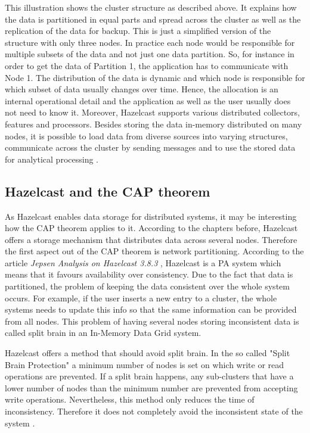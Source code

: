 This illustration shows the cluster structure as described above. It explains how the data is partitioned in equal parts and spread across the cluster as well as the replication of the data for backup. This is just a simplified version of the structure with only three nodes. In practice each node would be responsible for multiple subsets of the data and not just one data partition. So, for instance in order to get the data of Partition 1, the application has to communicate with Node 1. The distribution of the data is dynamic and which node is responsible for which subset of data usually changes over time. Hence, the allocation is an internal operational detail and the application as well as the user usually does not need to know it.
Moreover, Hazelcast supports various distributed collectors, features and processors. Besides storing the data in-memory distributed on many nodes, it is possible to load data from diverse sources into varying structures, communicate across the cluster by sending messages and to use the stored data for analytical processing \parencite{johns2015}.


\subsection{Hazelcast and the CAP theorem}
As Hazelcast enables data storage for distributed systems, it may be interesting how the CAP theorem applies to it. According to the chapters before, Hazelcast offers a storage mechanism that distributes data across several nodes. Therefore the first aspect out of the CAP theorem is network partitioning. According to the article \textit{Jepsen Analysis on Hazelcast 3.8.3} \parencite{hazelcastCP}, Hazelcast is a PA system which means that it favours availability over consistency. Due to the fact that data is partitioned, the problem of keeping the data consistent over the whole system occurs. For example, if the user inserts a new entry to a cluster, the whole systems needs to update this info so that the same information can be provided from all nodes. This problem of having several nodes storing inconsistent data is called split brain in an In-Memory Data Grid system.

Hazelcast offers a method that should avoid split brain. In the so called "Split Brain Protection" a minimum number of nodes is set on which write or read operations are prevented. If a split brain happens, any sub-clusters that have a lower number of nodes than the minimum number are prevented from accepting write operations. Nevertheless, this method only reduces the time of inconsistency. Therefore it does not completely avoid the inconsistent state of the system \parencite{hazelcastCP}.

